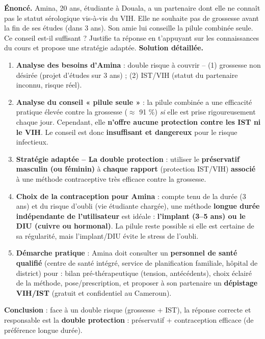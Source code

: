 \documentclass[11pt]{article}
\begin{document}
\begin{exoresolu}
\textbf{Énoncé.} Amina, 20 ans, étudiante à Douala, a un partenaire dont elle ne connaît pas le statut sérologique vis-à-vis du VIH. Elle ne souhaite pas de grossesse avant la fin de ses études (dans 3 ans). Son amie lui conseille la pilule combinée seule. Ce conseil est-il suffisant ? Justifie ta réponse en t'appuyant sur les connaissances du cours et propose une stratégie adaptée.
\tcblower
\textbf{Solution détaillée.}
\begin{enumerate}
\item \textbf{Analyse des besoins d'Amina} : double risque à couvrir -- (1) grossesse non désirée (projet d'études sur 3 ans) ; (2) IST/VIH (statut du partenaire inconnu, risque réel).
\item \textbf{Analyse du conseil « pilule seule »} : la pilule combinée a une efficacité pratique élevée contre la grossesse ($\approx$ 91 \%) \emph{si} elle est prise rigoureusement chaque jour. Cependant, elle \textbf{n'offre aucune protection contre les IST ni le VIH}. Le conseil est donc \textbf{insuffisant et dangereux} pour le risque infectieux.
\item \textbf{Stratégie adaptée -- La double protection} : utiliser le \textbf{préservatif masculin (ou féminin)} à \textbf{chaque rapport} (protection IST/VIH) \textbf{associé} à une méthode contraceptive très efficace contre la grossesse.
\item \textbf{Choix de la contraception pour Amina} : compte tenu de la durée (3 ans) et du risque d'oubli (vie étudiante chargée), une méthode \textbf{longue durée indépendante de l'utilisateur} est idéale : \textbf{l'implant (3--5 ans) ou le DIU (cuivre ou hormonal)}. La pilule reste possible si elle est certaine de sa régularité, mais l'implant/DIU évite le stress de l'oubli.
\item \textbf{Démarche pratique} : Amina doit consulter un \textbf{personnel de santé qualifié} (centre de santé intégré, service de planification familiale, hôpital de district) pour : bilan pré-thérapeutique (tension, antécédents), choix éclairé de la méthode, pose/prescription, et proposer à son partenaire un \textbf{dépistage VIH/IST} (gratuit et confidentiel au Cameroun).
\end{enumerate}
\textbf{Conclusion} : face à un double risque (grossesse + IST), la réponse correcte et responsable est la \textbf{double protection} : préservatif + contraception efficace (de préférence longue durée).
\end{exoresolu}
\end{document}
